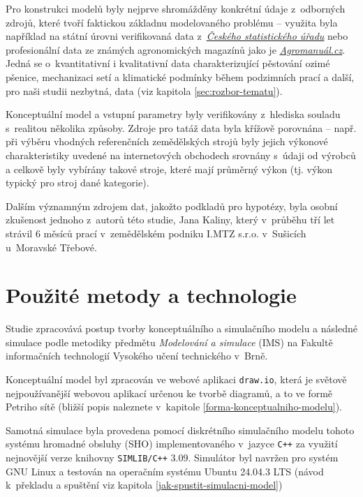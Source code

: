 \documentclass[11pt,a4paper]{article}
\begin{document}
Pro konstrukci modelů byly nejprve shromážděny konkrétní údaje z~odborných zdrojů, které tvoří faktickou základnu modelovaného problému -- využita byla například na státní úrovni verifikovaná data z~\href{https://csu.gov.cz/}{\emph{Českého statistického úřadu}} nebo profesionální data ze známých agronomických magazínů jako je \href{https://www.agromanual.cz/}{\emph{Agromanuál.cz}}. Jedná se o~kvantitativní i kvalitativní data charakterizující pěstování ozimé pšenice, mechanizaci setí a klimatické podmínky během podzimních prací a další, pro naši studii nezbytná, data (viz kapitola \ref{sec:rozbor-tematu}).

Konceptuální model a vstupní parametry byly verifikovány z~hlediska souladu s~realitou několika způsoby. Zdroje pro tatáž data byla křížově porovnána -- např. při výběru vhodných referenčních zemědělských strojů byly jejich výkonové charakteristiky uvedené na internetových obchodech srovnány s~údaji od výrobců a celkově byly vybírány takové stroje, které mají průměrný výkon (tj. výkon typický pro stroj dané kategorie).

Dalším významným zdrojem dat, jakožto podkladů pro hypotézy, byla osobní zkušenost jednoho z~autorů této studie, Jana Kaliny, který v~průběhu tří let strávil 6 měsíců prací v~zemědělském podniku I.MTZ s.r.o.\cite{imtz} v~Sušicích u~Moravské Třebové.

\section{Použité metody a technologie}

Studie zpracovává postup tvorby konceptuálního a simulačního modelu a následné simulace podle metodiky předmětu \emph{Modelování a simulace} (IMS)\cite{ims} na Fakultě informačních technologií Vysokého učení technického v~Brně. 

Konceptuální model byl zpracován ve webové aplikaci \texttt{draw.io}\cite{draw.io}, která je světově nejpoužívanější webovou aplikací určenou ke tvorbě diagramů, a to ve formě Petriho sítě (bližší popis naleznete v~kapitole \ref{forma-konceptualniho-modelu}).

Samotná simulace byla provedena pomocí diskrétního simulačního modelu tohoto systému hromadné obsluhy (SHO) implementovaného v~jazyce \texttt{C++} za využití nejnovější verze knihovny \texttt{SIMLIB/C++} 3.09\cite{simlib}. Simulátor byl navržen pro systém GNU Linux a testován na operačním systému Ubuntu 24.04.3 LTS (návod k~překladu a spuštění viz kapitola \ref{jak-spustit-simulacni-model})
\end{document}
